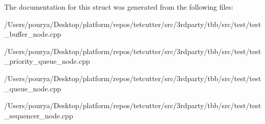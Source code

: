 The documentation for this struct was generated from the following files\+:\begin{DoxyCompactItemize}
\item 
/\+Users/pourya/\+Desktop/platform/repos/tetcutter/src/3rdparty/tbb/src/test/test\+\_\+buffer\+\_\+node.\+cpp\item 
/\+Users/pourya/\+Desktop/platform/repos/tetcutter/src/3rdparty/tbb/src/test/test\+\_\+priority\+\_\+queue\+\_\+node.\+cpp\item 
/\+Users/pourya/\+Desktop/platform/repos/tetcutter/src/3rdparty/tbb/src/test/test\+\_\+queue\+\_\+node.\+cpp\item 
/\+Users/pourya/\+Desktop/platform/repos/tetcutter/src/3rdparty/tbb/src/test/test\+\_\+sequencer\+\_\+node.\+cpp\end{DoxyCompactItemize}
